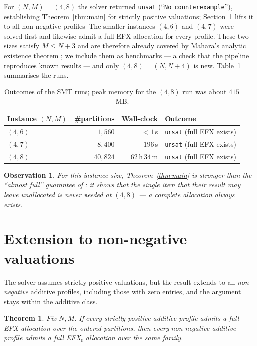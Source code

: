 \documentclass[11pt,a4paper]{article}
\theoremstyle{definition}
\theoremstyle{plain}
\newtheorem{theorem}{Theorem}
\newtheorem{observation}{Observation}
\newcommand{\EFX}{\textsf{EFX}}
\newcommand{\agents}{N}
\newcommand{\goods}{M}
\begin{document}
For $(\agents,\goods)=(4,8)$ the solver returned \texttt{unsat}
(``\texttt{No counterexample}''), establishing Theorem~\ref{thm:main} for strictly
positive valuations; Section~\ref{sec:nonneg} lifts it to all non-negative
profiles. The
smaller instances $(4,6)$ and $(4,7)$ were solved first and likewise admit a full
\EFX{} allocation for every profile. These two sizes satisfy
$\goods\leq\agents+3$ and are therefore already covered by Mahara's analytic
existence theorem \cite{Mahara2024}; we include them as benchmarks --- a check that
the pipeline reproduces known results --- and only $(4,8)=(\agents,\agents+4)$ is
new. Table~\ref{tab:results} summarises the runs.

\begin{table}[h]
\centering
\begin{tabular}{lrrl}
\toprule
Instance $(\agents,\goods)$ & \#partitions & Wall-clock & Outcome\\
\midrule
$(4,6)$ & $1{,}560$  & $<1$\,s        & \texttt{unsat} (full \EFX{} exists)\\
$(4,7)$ & $8{,}400$  & $196$\,s       & \texttt{unsat} (full \EFX{} exists)\\
$(4,8)$ & $40{,}824$ & $62$\,h\,$34$\,m & \texttt{unsat} (full \EFX{} exists)\\
\bottomrule
\end{tabular}
\caption{Outcomes of the SMT runs; peak memory for the $(4,8)$ run was about
$415$\,MB.}
\label{tab:results}
\end{table}

\begin{observation}
For this instance size, Theorem~\ref{thm:main} is stronger than the ``almost
full'' guarantee of \cite{BergerCohenFeldmanFiat2022}: it shows that the single
item that their result may leave unallocated is never needed at $(4,8)$ --- a
complete allocation always exists.
\end{observation}

\section{Extension to non-negative valuations}
\label{sec:nonneg}

The solver assumes strictly positive valuations, but the result extends to all
\emph{non-negative} additive profiles, including those with zero entries, and the
argument stays within the additive class.

\begin{theorem}
\label{thm:nonneg}
Fix $\agents,\goods$. If every strictly positive additive profile admits a full
\EFX{} allocation over the ordered partitions, then every
non-negative additive profile admits a full \EFX$_0$ allocation over the same
family.
\end{theorem}
\end{document}

